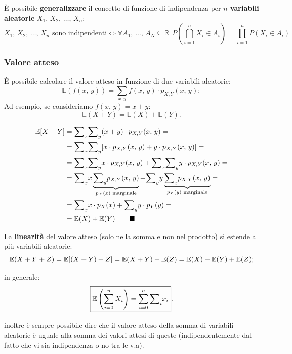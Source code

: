 \noindent È possibile \textbf{generalizzare} il concetto di funzione di indipendenza per \textbf{$n$ variabili aleatorie} $X_1, \, X_2, \, \dots, \, X_n$: 
\[
\boxed{
X_1, \, X_2, \, \dots, \, X_n \text{ sono indipendenti} \Longleftrightarrow \forall A_1, \, \dots, \, A_N \subseteq \mathbb{R} \: \ 
P \left( \bigcap_{i=1}^n X_i \in A_i \right ) = \prod_{i=1}^n P(X_i \in A_i)
}
\]


\subsubsection{Valore atteso}
È possibile calcolare il valore atteso in funzione di due variabili aleatorie:
\[
\boxed{\mathbb E(f(x, \, y)) = {\sum}_{x,y} f(x, \, y) \cdot p_{X,Y} (x, \, y)};
\]
Ad esempio, se consideriamo $f(x, \, y) = x + y$: \[
\boxed{\mathbb E(X + Y) = \mathbb E(X) + \mathbb E(Y)}.
\]

\begin{dimostrazione}[$\mathbb E{[}X + Y{]} = \mathbb E(X) + \mathbb E(Y)$]
\begin{align*}
    \mathbb{E}[X+Y] &= {\sum}_x {\sum}_y (x + y) \cdot p_{X,Y}(x, \, y) = \\
    &= {\sum}_x {\sum}_y [ x \cdot p_{X,Y}(x, \, y) + y \cdot p_{X, Y} (x, \, y) ] = \\
    &= {\sum}_x {\sum}_y x \cdot p_{X, Y} (x, \, y) + {\sum}_x {\sum}_y y \cdot p_{X, Y} (x, \, y) = \\
    &= {\sum}_x x \underbrace{{\sum}_y p_{X, Y} (x, \, y)}_{\textnormal{$p_X(x)$ marginale}} + {\sum}_y y \underbrace{{\sum}_x p_{X, Y} (x, \, y)}_{\textnormal{$p_Y(y)$ marginale}} = \\
    &= {\sum}_x x \cdot p_X (x) + {\sum}_y y \cdot p_Y (y) = \\
    &= \mathbb{E}(X) + \mathbb{E}(Y) \tag*{$\blacksquare$}
\end{align*}
\end{dimostrazione}

\noindent La \textbf{linearità} del valore atteso (solo nella somma e non nel prodotto) si estende a più variabili aleatorie: \[
\mathbb{E}(X + Y + Z) = \mathbb{E}[(X + Y) + Z] = \mathbb{E}(X + Y) + \mathbb{E}(Z) = \mathbb{E}(X) + \mathbb{E}(Y) + \mathbb{E}(Z);
\]

\noindent in generale: \[
\boxed{
\mathbb{E} \left ( \sum_{i=0}^n X_i \right ) = \sum_{i=0}^n {\sum}_i{x_i}
}.
\]

\noindent inoltre è sempre possibile dire che il valore atteso della somma di variabili aleatorie è  uguale alla somma dei valori attesi di queste (indipendentemente dal fatto che vi sia indipendenza o no tra le v.a). \\

